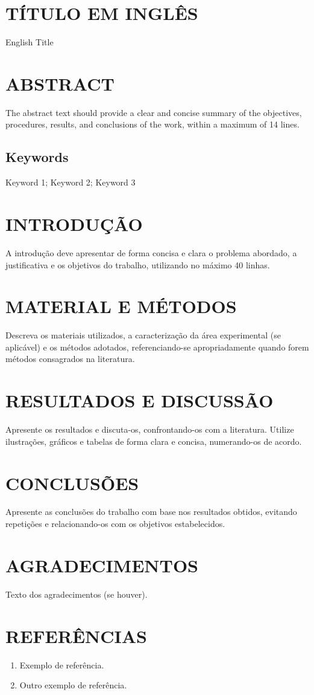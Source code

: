 \documentclass[a4paper]{article}
\begin{document}
	\section*{TÍTULO EM INGLÊS}
	English Title
	
	\section*{ABSTRACT}
	The abstract text should provide a clear and concise summary of the objectives, procedures, results, and conclusions of the work, within a maximum of 14 lines.
	
	\subsection*{Keywords}
	Keyword 1; Keyword 2; Keyword 3
	
	\section{INTRODUÇÃO}
	A introdução deve apresentar de forma concisa e clara o problema abordado, a justificativa e os objetivos do trabalho, utilizando no máximo 40 linhas.
	
	\section{MATERIAL E MÉTODOS}
	Descreva os materiais utilizados, a caracterização da área experimental (se aplicável) e os métodos adotados, referenciando-se apropriadamente quando forem métodos consagrados na literatura.
	
	\section{RESULTADOS E DISCUSSÃO}
	Apresente os resultados e discuta-os, confrontando-os com a literatura. Utilize ilustrações, gráficos e tabelas de forma clara e concisa, numerando-os de acordo.
	
	\section{CONCLUSÕES}
	Apresente as conclusões do trabalho com base nos resultados obtidos, evitando repetições e relacionando-os com os objetivos estabelecidos.
	
	\section*{AGRADECIMENTOS}
	Texto dos agradecimentos (se houver).
	
	\section*{REFERÊNCIAS}
	\begin{enumerate}
		\item Exemplo de referência.
		\item Outro exemplo de referência.
	\end{enumerate}
	
\end{document}
